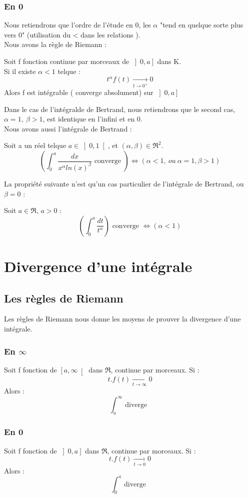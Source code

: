 \subsubsection{En 0}
Nous retiendrons que l'ordre de l'étude en 0, les $\alpha$ "tend en quelque sorte plus vers 0" (utilisation du < dans les relations ).\\
Nous avons la règle de Riemann :
\begin{prop}
Soit f fonction continue par morceaux de $\left]0,a\right]$ dans K.\\
Si il existe $\alpha < 1$ telque : 
$$t^{\alpha}f(t) \underset{t \rightarrow 0^+}\rightarrow 0$$
Alors f est intégrable ( converge absolument) sur $\left]0,a\right]$
\end{prop}
Dans le cas de l'intégralde de Bertrand, nous retiendrons que le second cas, $\alpha =1,~ \beta > 1$, est identique en l'infini et en 0.\\
Nous avons aussi l'intégrale de Bertrand : 
\begin{prop}
Soit a un réel telque $a \in \left]0,1\right[$, et $(\alpha,\beta) \in \Re^2$.
$$\left(\int_0^a \dfrac{dx}{x^{\alpha}ln(x)^{\beta}} \mbox{ converge }\right) \Leftrightarrow ( \alpha < 1 ,~ ou~ \alpha=1,\beta>1)$$
\end{prop}
La propriété suivante n'est qu'un cas particulier de l'intégrale de Bertrand, ou $\beta = 0$ :
\begin{prop}
Soit $a \in \Re$, $a>0$ :
$$\left(\int_0^a \dfrac{dt}{t^{\alpha}}\right) \mbox{ converge } \Leftrightarrow (\alpha < 1)$$
\end{prop}
\section{Divergence d'une intégrale}
\subsection{Les règles de Riemann}
Les règles de Riemann nous donne les moyens de prouver la divergence d'une intégrale.
\subsubsection{En $\infty$}
Soit f fonction de $\left[a,\infty\right[$ dans $\Re$, continue par morceaux. Si :
$$t.f(t) \underset{t\rightarrow\infty}\rightarrow 0$$
Alors :
$$\int_a^{\infty} \mbox{ diverge }$$
\subsubsection{En 0}
Soit f fonction de $\left]0,a\right]$ dans $\Re$, continue par morceaux. Si :
$$t.f(t) \underset{t\rightarrow 0}\rightarrow 0$$
Alors :
$$\int_0^a \mbox{ diverge }$$
